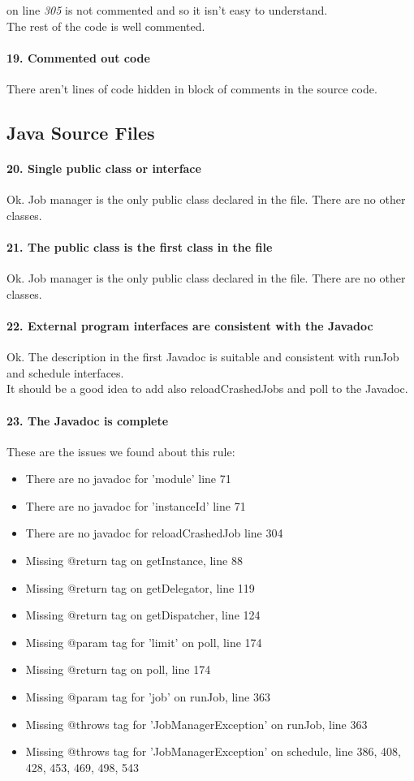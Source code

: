 \documentclass[english]{article}
\begin{document}
{{ on line \textit{305} is not commented and so it isn't easy to understand. \\
The rest of the code is well commented.

\paragraph{19. Commented out code}
There aren't lines of code hidden in block of comments in the source code.

\subsection{Java Source Files}
\paragraph{20. Single public class or interface}
Ok.
Job manager is the only public class declared in the file.
There are no other classes.

\paragraph{21. The public class is the first class in the file}
Ok.
Job manager is the only public class declared in the file.
There are no other classes.

\paragraph{22. External program interfaces are consistent with the Javadoc}
Ok.
The description in the first Javadoc is suitable and consistent with runJob and schedule interfaces.\\
It should be a good idea to add also reloadCrashedJobs and poll to the Javadoc.

\paragraph{23. The Javadoc is complete}
These are the issues we found about this rule:
\begin{itemize}
	\item There are no javadoc for 'module' line 71
	\item There are no javadoc for 'instanceId' line 71
	\item There are no javadoc for reloadCrashedJob line 304
	\item Missing @return tag on getInstance, line 88
	\item Missing @return tag on getDelegator, line 119
	\item Missing @return tag on getDispatcher, line 124
	\item Missing @param tag for 'limit' on poll, line 174
	\item Missing @return tag on poll, line 174
	\item Missing @param tag for 'job' on runJob, line 363
	\item Missing @throws tag for 'JobManagerException' on runJob, line 363
	\item Missing @throws tag for 'JobManagerException' on schedule, line 386, 408, 428, 453, 469, 498, 543
\end{itemize}

}}
\end{document}
